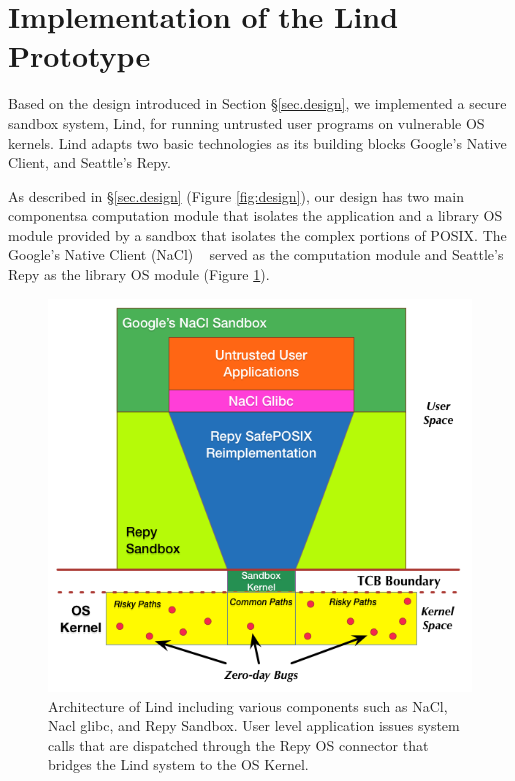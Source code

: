 \section{Implementation of the Lind Prototype}
\label{sec.implementation}

Based on the design introduced in Section \S{\ref{sec.design}}, 
we implemented a secure sandbox system, Lind, 
for running untrusted user programs on vulnerable OS kernels. 
Lind adapts two basic technologies as its building blocks\textendash 
Google's Native Client, and Seattle's Repy. 

As described in \S{\ref{sec.design}} (Figure \ref{fig:design}), our design has
two main components\textendash a computation module that isolates the 
application and a library OS module provided by a sandbox that isolates the complex 
portions of POSIX.
The Google's Native Client (NaCl) ~\cite{NaCl-09} served as the computation 
module 
and Seattle's Repy as the library OS module (Figure \ref{fig:architecture}).

\begin{figure}%
\centering
\includegraphics[width=1.0\columnwidth]{diagram/lind_architecture_new.png}
\caption{Architecture of Lind including various components such as NaCl, Nacl glibc, and Repy Sandbox. 
User level application issues system calls that are dispatched through the Repy OS connector that bridges the Lind system to the OS Kernel.}

\label{fig:architecture}
\end{figure}

